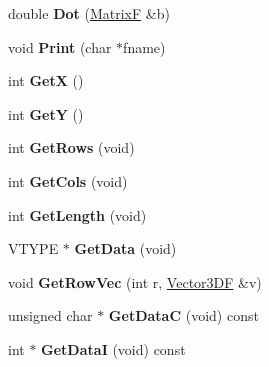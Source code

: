 \begin{DoxyCompactItemize}
\item 
\hypertarget{class_matrix_f_af1a2270db36bc001d7149b11dfdf9ff7}{double {\bfseries Dot} (\hyperlink{class_matrix_f}{Matrix\+F} \&b)}\label{class_matrix_f_af1a2270db36bc001d7149b11dfdf9ff7}

\item 
\hypertarget{class_matrix_f_a50d3a7f2282e51ae452464b96cb9131d}{void {\bfseries Print} (char $\ast$fname)}\label{class_matrix_f_a50d3a7f2282e51ae452464b96cb9131d}

\item 
\hypertarget{class_matrix_f_a402e0496c2e0065b293aa0afb0b411e1}{int {\bfseries Get\+X} ()}\label{class_matrix_f_a402e0496c2e0065b293aa0afb0b411e1}

\item 
\hypertarget{class_matrix_f_a5324794099f0dc1df1c87aa71efd91b4}{int {\bfseries Get\+Y} ()}\label{class_matrix_f_a5324794099f0dc1df1c87aa71efd91b4}

\item 
\hypertarget{class_matrix_f_a4717fdba609b2cefb2e8275d74f8cc60}{int {\bfseries Get\+Rows} (void)}\label{class_matrix_f_a4717fdba609b2cefb2e8275d74f8cc60}

\item 
\hypertarget{class_matrix_f_a4dd89e620705520a4de7ec4fd0aa024b}{int {\bfseries Get\+Cols} (void)}\label{class_matrix_f_a4dd89e620705520a4de7ec4fd0aa024b}

\item 
\hypertarget{class_matrix_f_ae66ec3e8caddd4ecc24d8f059677cdc9}{int {\bfseries Get\+Length} (void)}\label{class_matrix_f_ae66ec3e8caddd4ecc24d8f059677cdc9}

\item 
\hypertarget{class_matrix_f_ab8ac92635722ab66875b90c36d92d394}{V\+T\+Y\+P\+E $\ast$ {\bfseries Get\+Data} (void)}\label{class_matrix_f_ab8ac92635722ab66875b90c36d92d394}

\item 
\hypertarget{class_matrix_f_af6b2d92b6ff4592308e5bc35b421f985}{void {\bfseries Get\+Row\+Vec} (int r, \hyperlink{class_vector3_d_f}{Vector3\+D\+F} \&v)}\label{class_matrix_f_af6b2d92b6ff4592308e5bc35b421f985}

\item 
\hypertarget{class_matrix_f_abf410ddeb4c086509f3db06e9e4adf32}{unsigned char $\ast$ {\bfseries Get\+Data\+C} (void) const }\label{class_matrix_f_abf410ddeb4c086509f3db06e9e4adf32}

\item 
\hypertarget{class_matrix_f_ae501166b53b43583b3dfbd74c836c5e4}{int $\ast$ {\bfseries Get\+Data\+I} (void) const }\label{class_matrix_f_ae501166b53b43583b3dfbd74c836c5e4}


\end{DoxyCompactItemize}
